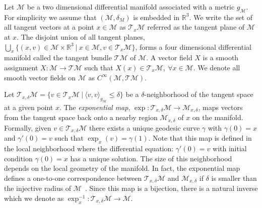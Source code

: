 \documentclass[10pt,twocolumn,letterpaper]{article}
\def\M{\mathcal{M}}
\def\T{\mathcal{T}}
\def\RR{\mathbb{R}}
\begin{document}
Let $\M$ be a two dimensional differential manifold associated with a metric $g_{\M}$. For simplicity we assume that $(\M,\delta_M)$ is embedded in $\RR^3$. We write the set of all tangent vectors at a point $x\in\M$ as $\T_x\M$ referred as the tangent plane of $\M$ at $x$. The disjoint union of all tangent planes, $\bigcup_{x} \{(x,v)\in\M\times \RR^3~|~x\in\M, v\in\T_x\M\}$, forms a four dimensional differential manifold called the tangent bundle $\T\M$ of $\M$. A vector field $X$ is a smooth assignment $X: \M\rightarrow\T\M$ such that $X(x)\in\T_x\M, ~\forall x\in\M$. We denote all smooth vector fields on $\M$ as $C^{\infty}(\M, \T \M)$.

Let $\T_{x,\delta} \M = \{v\in \T_{x}\M ~|~ \langle v,v\rangle_{g_{\M}} \leq \delta\}$ be a $\delta$-neighborhood of the tangent space at a given point $x$. The {\it exponential map}, $\exp: \T_{x,\delta} \M \rightarrow \M_{x,\delta}$, maps vectors from the tangent space back onto a nearby region $\M_{x,\delta}$ of $x$ on the manifold. Formally, given $v\in \T_{x,\delta}\M$ there exists a unique geodesic curve $\gamma$ with $\gamma(0)= x$ and $\gamma'(0) = v$ such that $\exp_{x}(v) = \gamma(1)$.
Note that this map is defined in the local neighborhood where the differential equation: $\gamma'(0) = v$ with initial condition $\gamma(0) = x$ has a unique solution. The size of this neighborhood depends on the local geometry of the manifold. In fact,  the exponential map defines a one-to-one correspondence between $\T_{x,\delta}\M$ and $\M_{x,\delta}$ if $\delta$ is smaller than the injective radius of $\M$~\cite{kobayashi1969foundations,chavel2006riemannian}. Since this map is a bijection, there is a natural inverse which we denote as $\exp_{x}^{-1}: \T_{x,\delta} \M \rightarrow \M$.
\end{document}
